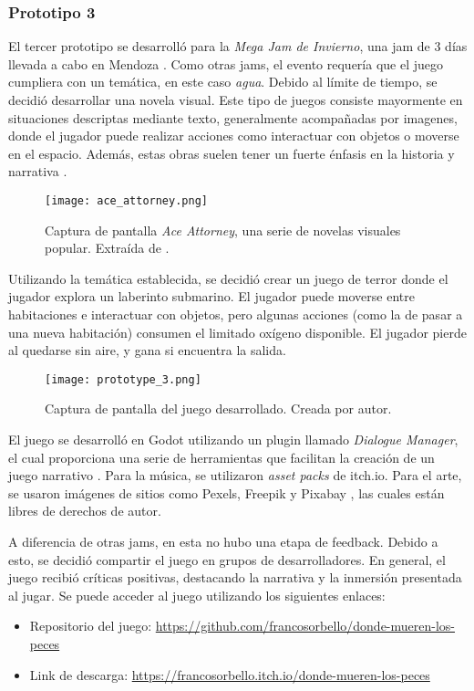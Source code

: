 \subsubsection{Prototipo 3}
\label{sec:prototype_3}
El tercer prototipo se desarrolló para la \textit{Mega Jam de Invierno}, una jam de 3 días llevada a cabo en Mendoza \cite{MEGAJAMInvierno}. Como otras jams, el evento requería que el juego cumpliera con un temática, en este caso \textit{agua}.
Debido al límite de tiempo, se decidió desarrollar una novela visual. Este tipo de juegos consiste mayormente en situaciones descriptas mediante texto, generalmente acompañadas por imagenes, donde el jugador puede realizar acciones como interactuar con objetos o moverse en el espacio. Además, estas obras suelen tener un fuerte énfasis en la historia y narrativa \cite{VisualNovel2025}.
%
\begin{figure}[H]
  \centering
  \texttt{[image: ace\_attorney.png]}
  \caption{Captura de pantalla \textit{Ace Attorney}, una serie de novelas visuales popular. Extraída de \cite{FilePhoenixWright2020}.}
  \label{fig:x ejemplo novela visual} 
\end{figure}
%
\par Utilizando la temática establecida, se decidió crear un juego de terror donde el jugador explora un laberinto submarino. El jugador puede moverse entre habitaciones e interactuar con objetos, pero algunas acciones (como la de pasar a una nueva habitación) consumen el limitado oxígeno disponible. El jugador pierde al quedarse sin aire, y gana si encuentra la salida.
%
\begin{figure}[H]
  \centering
  \texttt{[image: prototype\_3.png]}
  \caption{Captura de pantalla del juego desarrollado. Creada por autor.}
  \label{fig:x prototypo 3 captura} 
\end{figure}
%
\par El juego se desarrolló en Godot utilizando un plugin llamado \textit{Dialogue Manager}, el cual proporciona una serie de herramientas que facilitan la creación de un juego narrativo \cite{NathanhoadGodot_dialogue_managerPowerful}. Para la música, se utilizaron \textit{asset packs} de itch.io. Para el arte, se usaron imágenes de sitios como Pexels, Freepik y Pixabay \cite{57MillionStunning,FreepikAllinOneAI,FotosStockGratis}, las cuales están libres de derechos de autor.
\bigbreak
\par A diferencia de otras jams, en esta no hubo una etapa de feedback. Debido a esto, se decidió compartir el juego en grupos de desarrolladores. En general, el juego recibió críticas positivas, destacando la narrativa y la inmersión presentada al jugar. Se puede acceder al juego utilizando los siguientes enlaces:
\begin{itemize}
  \item Repositorio del juego: \url{https://github.com/francosorbello/donde-mueren-los-peces}
  \item Link de descarga: \url{https://francosorbello.itch.io/donde-mueren-los-peces}
\end{itemize}
%
